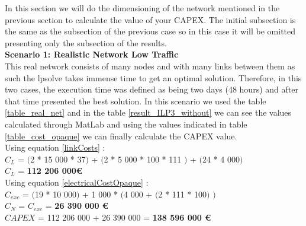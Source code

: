 In this section we will do the dimensioning of the network mentioned in the previous section to calculate the value of your CAPEX.
The initial subsection is the same as the subsection of the previous case so in this case it will be omitted presenting only the subsection of the results.\\

\textbf{Scenario 1: Realistic Network Low Traffic} \label{Scenario3_opaque} \\

This real network consists of many nodes and with many links between them as such the lpsolve takes immense time to get an optimal solution. Therefore, in this two cases, the execution time was defined as being two days (48 hours) and after that time presented the best solution. In this scenario we used the table \ref{table_real_net} and in the table \ref{result_ILP3_without} we can see the values calculated through MatLab and using the values indicated in table \ref{table_cost_opaque} we can finally calculate the CAPEX value.\\

Using equation \ref{linkCosts} : \\
$C_L$ = $($2 * 15 000 * 37$)$ + $($2 * 5 000 * 100 * 111 $)$ + $($24 * 4 000$)$ \\
$C_L$ = \textbf{112 206 000\euro} \\

Using equation \ref{electricalCostOpaque} : \\
$C_{exc}$ = $($19 * 10 000$)$ + 1 000 * $($4 000 + $($2 * 111 * 100$)$ $)$ \\
$C_N$ = $C_{exc}$ = \textbf{26 390 000 \euro} \\

$CAPEX$ = 112 206 000 + 26 390 000 = \textbf{138 596 000 \euro}\\

